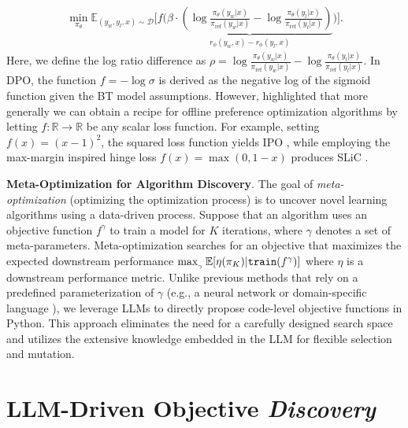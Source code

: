 \documentclass{article}
\theoremstyle{plain}
\theoremstyle{definition}
\theoremstyle{remark}
\begin{document}
\begin{align}
\min_{\pi_\theta}\mathbb{E}_{(y_w,y_l,x)\sim \mathcal{D}}\Bigg[f\Bigg(\underbrace{\beta\cdot\left(\log\frac{\pi_\theta(y_w|x)}{\pi_\text{ref}(y_w|x)} - \log\frac{\pi_\theta(y_l|x)}{\pi_\text{ref}(y_l|x)}\right)}_{r_\phi(y_w,x)-r_\phi(y_l,x)}\Bigg)\Bigg].\label{eq:dpo-loss}
\end{align}
Here, we define the log ratio difference as $\rho=\log\frac{\pi_\theta(y_w|x)}{\pi_\text{ref}(y_w|x)} - \log\frac{\pi_\theta(y_l|x)}{\pi_\text{ref}(y_l|x)}$. In DPO, the function $f = -\log\sigma$ is derived as the negative log of the sigmoid function given the BT model assumptions.
However, \citet{tang2024generalized} highlighted that more generally we can obtain a recipe for offline preference optimization algorithms by letting $f:\mathbb{R}\rightarrow\mathbb{R}$ be any scalar loss function. 
For example, setting $f(x) = \left(x-1\right)^2$, the squared loss function \citep{rosasco2004loss} yields IPO \citep{azar2023general}, while employing the max-margin inspired hinge loss \citep{boser1992training,cortes1995support} $f(x)=\max(0,1-x)$ produces SLiC \citep{zhao2023slic}.

\textbf{Meta-Optimization for Algorithm Discovery}.
The goal of \textsl{meta-optimization} (optimizing the optimization process) is to uncover novel learning algorithms using a data-driven process. Suppose that an algorithm uses an objective function $f^\gamma$ to train a model for $K$ iterations, where $\gamma$ denotes a set of meta-parameters. Meta-optimization searches for an objective that maximizes the expected downstream performance $\max_{_\gamma}\mathbb{E}[\eta(\pi_K) | \texttt{train}(f^\gamma)]$ where $\eta$ is a downstream performance metric. 
Unlike previous methods that rely on a predefined parameterization of $\gamma$ (e.g., a neural network \citep{hospedales2021meta} or domain-specific language \citep{alet2020meta}), we leverage LLMs to directly propose code-level objective functions in Python. This approach eliminates the need for a carefully designed search space and utilizes the extensive knowledge embedded in the LLM for flexible selection and mutation.

\section{LLM-Driven Objective \emph{Discovery}}
\label{sec:evolutionary_discovery_llm}
\end{document}
